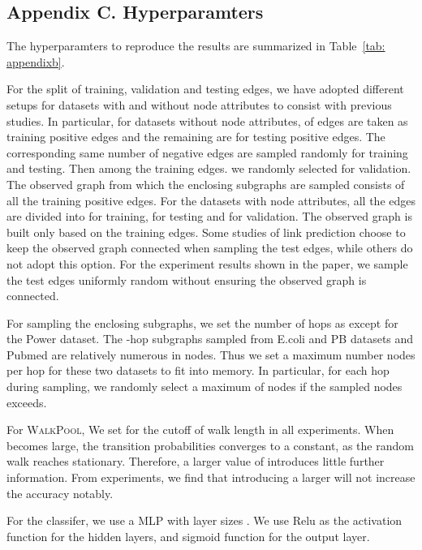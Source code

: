 \documentclass[11pt]{article}
\newcommand{\walkpool}{\textsc{WalkPool}\xspace}
\begin{document}
\subsection*{Appendix C. Hyperparamters}
The hyperparamters to reproduce the results are summarized in Table~\ref{tab: appendixb}.

For the split of training, validation and testing edges, we have adopted different setups for datasets with and without node attributes to consist with previous studies. In particular, for datasets without node attributes,  of edges are taken as training positive edges and the remaining  are for testing positive edges. The corresponding same number of negative edges are sampled randomly for training and testing. Then among the training edges. we randomly selected  for validation. The observed graph from which the enclosing subgraphs are sampled consists of all the training positive edges.
For the datasets with node attributes, all the edges are divided into  for training,  for testing and  for validation. The observed graph is built only based on the training edges. Some studies of link prediction choose to keep the observed graph connected when sampling the test edges, while others do not adopt this option. For the experiment results shown in the paper, we sample the test edges uniformly random without ensuring the observed graph is connected.   

For sampling the enclosing subgraphs, we set the number of hops as  except  for the Power dataset. The -hop subgraphs sampled from E.coli and PB datasets and Pubmed are relatively numerous in nodes. Thus we set a maximum number nodes per hop for these two datasets to fit into memory. In particular, for each hop during sampling, we randomly select a maximum of  nodes if the sampled nodes exceeds.

For \walkpool, We set  for the cutoff of walk length in all experiments. When  becomes large, the transition probabilities converges to a constant, as the random walk reaches stationary. Therefore, a larger value of  introduces little further information. From experiments, we find that introducing a larger  will not increase the accuracy notably. 

For the classifer, we use a MLP with layer sizes . We use Relu as the activation function for the hidden layers, and sigmoid function for the output layer.
\end{document}
